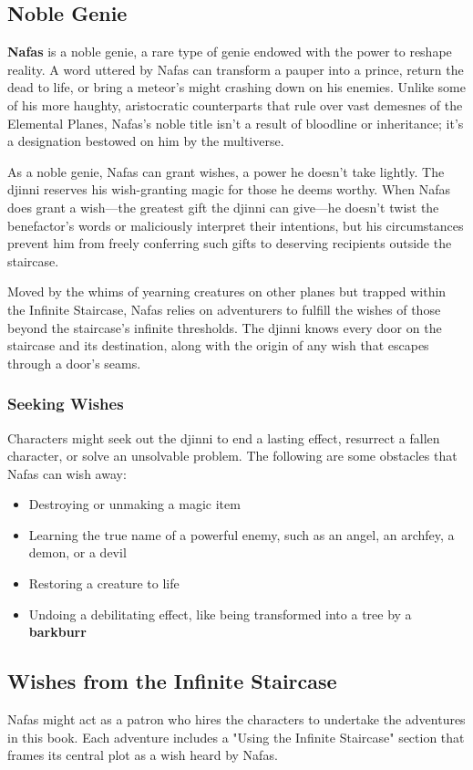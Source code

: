 \documentclass[10pt,a4paper,twoside,bg=print,twocolumn,openany,nodeprecatedcode]{dndbook}
\begin{document}
\subsection{Noble Genie}
\textbf{Nafas} is a noble genie, a rare type of genie endowed with the power to reshape reality. A word uttered by Nafas can transform a pauper into a prince, return the dead to life, or bring a meteor's might crashing down on his enemies. Unlike some of his more haughty, aristocratic counterparts that rule over vast demesnes of the Elemental Planes, Nafas's noble title isn't a result of bloodline or inheritance; it's a designation bestowed on him by the multiverse.

As a noble genie, Nafas can grant wishes, a power he doesn't take lightly. The djinni reserves his wish-granting magic for those he deems worthy. When Nafas does grant a wish—the greatest gift the djinni can give—he doesn't twist the benefactor's words or maliciously interpret their intentions, but his circumstances prevent him from freely conferring such gifts to deserving recipients outside the staircase.

Moved by the whims of yearning creatures on other planes but trapped within the Infinite Staircase, Nafas relies on adventurers to fulfill the wishes of those beyond the staircase's infinite thresholds. The djinni knows every door on the staircase and its destination, along with the origin of any wish that escapes through a door's seams.

\subsubsection{Seeking Wishes}
Characters might seek out the djinni to end a lasting effect, resurrect a fallen character, or solve an unsolvable problem. The following are some obstacles that Nafas can wish away:


\begin{itemize}
\item Destroying or unmaking a magic item
\item Learning the true name of a powerful enemy, such as an angel, an archfey, a demon, or a devil
\item Restoring a creature to life
\item Undoing a debilitating effect, like being transformed into a tree by a \textbf{barkburr}
\end{itemize}

\subsection{Wishes from the Infinite Staircase}
Nafas might act as a patron who hires the characters to undertake the adventures in this book. Each adventure includes a "Using the Infinite Staircase" section that frames its central plot as a wish heard by Nafas.
\end{document}
